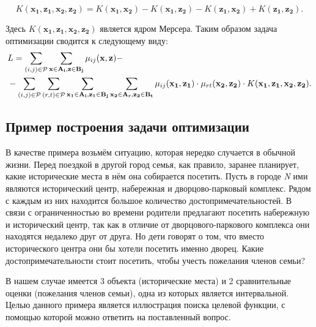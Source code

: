 \documentclass[12pt,a4paper,oneside]{article}
\begin{document}
\[
K(\mathbf{x_1}, \mathbf{z_1}, \mathbf{x_2}, \mathbf{z_2}) = K(\mathbf{x_1}, \mathbf{x_2}) - K(\mathbf{x_1}, \mathbf{z_2}) - K(\mathbf{z_1}, \mathbf{x_2}) + K(\mathbf{z_1}, \mathbf{z_2}).
\]

\par
Здесь \(K(\mathbf{x_1}, \mathbf{z_1}, \mathbf{x_2}, \mathbf{z_2})\) является ядром Мерсера. 
Таким образом задача оптимизации сводится к следующему виду:
\mbox{}
\begin{eqnarray*}
&L = \sum \limits_{(i, j) \in \mathcal{P}} \sum \limits_{\mathbf{x} \in \mathbf{A_i}, \mathbf{z} \in \mathbf{B_j}} \mu_{ij} (\mathbf{x}, \mathbf{z}) - \\
&- \sum \limits_{(i, j) \in \mathcal{P}} \sum \limits_{(r, t) \in \mathcal{P}} \sum \limits_{\mathbf{x_1} \in \mathbf{A_i}, \mathbf{z_1} \in \mathbf{B_j}} \sum \limits_{\mathbf{x_2} \in \mathbf{A_r}, \mathbf{z_2} \in \mathbf{B_t}} \mu_{ij} (\mathbf{x_1}, \mathbf{z_1}) \cdot \mu_{rt} (\mathbf{x_2}, \mathbf{z_2}) \cdot K(\mathbf{x_1}, \mathbf{z_1}, \mathbf{x_2}, \mathbf{z_2}).
\end{eqnarray*}


\subsection{Пример построения задачи оптимизации}

\par
В качестве примера возьмём ситуацию, которая нередко случается в обычной жизни.
Перед поездкой в другой город семья, как правило, заранее планирует, какие исторические места в нём она собирается посетить. 
Пусть в городе \textit{N} ими являются исторический центр, набережная и дворцово-парковый комплекс. 
Рядом с каждым из них находится большое количество достопримечательностей. 
В связи с ограниченностью во времени родители предлагают посетить набережную и исторический центр, так как в отличие от дворцового-паркового комплекса они находятся недалеко друг от друга. 
Но дети говорят о том, что вместо исторического центра они бы хотели посетить именно дворец. 
Какие достопримечательности стоит посетить, чтобы учесть пожелания членов семьи?

\par
В нашем случае имеется 3 объекта (исторические места) и 2 сравнительные оценки (пожелания членов семьи), одна из которых является интервальной. 
Целью данного примера является иллюстрация поиска целевой функции, с помощью которой можно ответить на поставленный вопрос. 
\end{document}
